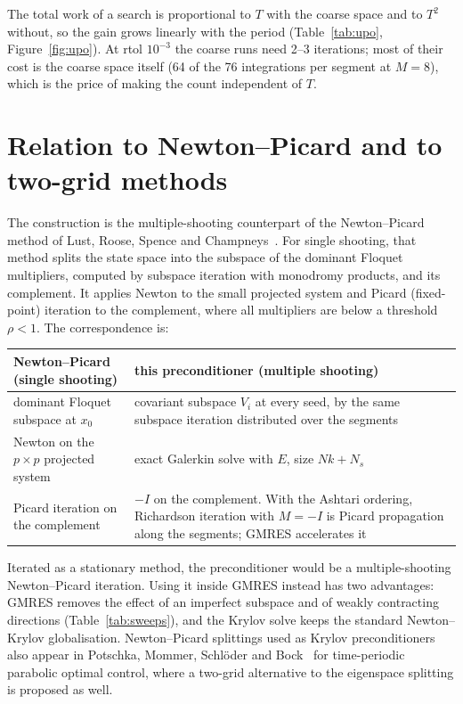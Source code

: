 \documentclass[11pt,a4paper]{article}
\begin{document}
The total work of a search is proportional to $T$ with the coarse space and to $T^2$ without, so the gain grows linearly with the period (Table~\ref{tab:upo}, Figure~\ref{fig:upo}). At rtol $10^{-3}$ the coarse runs need 2--3 iterations; most of their cost is the coarse space itself (64 of the 76 integrations per segment at $M = 8$), which is the price of making the count independent of $T$.

\section{Relation to Newton--Picard and to two-grid methods}

The construction is the multiple-shooting counterpart of the Newton--Picard method of Lust, Roose, Spence and Champneys~\cite{lust1998}. For single shooting, that method splits the state space into the subspace of the dominant Floquet multipliers, computed by subspace iteration with monodromy products, and its complement. It applies Newton to the small projected system and Picard (fixed-point) iteration to the complement, where all multipliers are below a threshold $\rho < 1$. The correspondence is:

\begin{center}
\begin{tabular}{p{}p{}}
\toprule
Newton--Picard (single shooting) & this preconditioner (multiple shooting)\\
\midrule
dominant Floquet subspace at $x_0$ & covariant subspace $V_i$ at every seed, by the same subspace iteration distributed over the segments\\
Newton on the $p\times p$ projected system & exact Galerkin solve with $E$, size $Nk + N_s$\\
Picard iteration on the complement & $-I$ on the complement. With the Ashtari ordering, Richardson iteration with $M = -I$ is Picard propagation along the segments; GMRES accelerates it\\
\bottomrule
\end{tabular}
\end{center}

Iterated as a stationary method, the preconditioner would be a multiple-shooting Newton--Picard iteration. Using it inside GMRES instead has two advantages: GMRES removes the effect of an imperfect subspace and of weakly contracting directions (Table~\ref{tab:sweeps}), and the Krylov solve keeps the standard Newton--Krylov globalisation. Newton--Picard splittings used as Krylov preconditioners also appear in Potschka, Mommer, Schl\"oder and Bock~\cite{potschka2012} for time-periodic parabolic optimal control, where a two-grid alternative to the eigenspace splitting is proposed as well.
\end{document}
